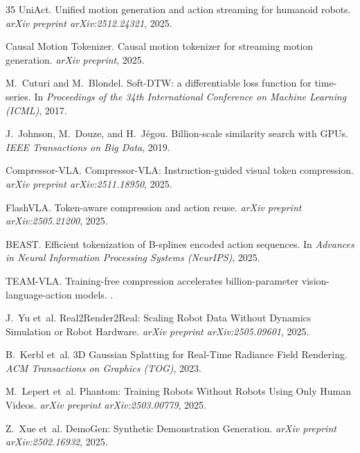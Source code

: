 \documentclass[11pt]{article}
\begin{document}
\begin{thebibliography}{35}
  UniAct.
  \newblock Unified motion generation and action streaming for humanoid robots.
  \newblock \emph{arXiv preprint arXiv:2512.24321}, 2025.

  Causal Motion Tokenizer.
  \newblock Causal motion tokenizer for streaming motion generation.
  \newblock \emph{arXiv preprint}, 2025.

  M.~Cuturi and M.~Blondel.
  \newblock Soft-DTW: a differentiable loss function for time-series.
  \newblock In \emph{Proceedings of the 34th International Conference on Machine Learning (ICML)}, 2017.

  J.~Johnson, M.~Douze, and H.~J\'egou.
  \newblock Billion-scale similarity search with GPUs.
  \newblock \emph{IEEE Transactions on Big Data}, 2019.

  Compressor-VLA.
  \newblock Compressor-VLA: Instruction-guided visual token compression.
  \newblock \emph{arXiv preprint arXiv:2511.18950}, 2025.

  FlashVLA.
  \newblock Token-aware compression and action reuse.
  \newblock \emph{arXiv preprint arXiv:2505.21200}, 2025.

  BEAST.
  \newblock Efficient tokenization of B-splines encoded action sequences.
  \newblock In \emph{Advances in Neural Information Processing Systems (NeurIPS)}, 2025.

  TEAM-VLA.
  \newblock Training-free compression accelerates billion-parameter vision-language-action models.
  .

  J.~Yu et~al.
  \newblock Real2Render2Real: Scaling Robot Data Without Dynamics Simulation or Robot Hardware.
  \newblock \emph{arXiv preprint arXiv:2505.09601}, 2025.

  B.~Kerbl et~al.
  \newblock 3D Gaussian Splatting for Real-Time Radiance Field Rendering.
  \newblock \emph{ACM Transactions on Graphics (TOG)}, 2023.

  M.~Lepert et~al.
  \newblock Phantom: Training Robots Without Robots Using Only Human Videos.
  \newblock \emph{arXiv preprint arXiv:2503.00779}, 2025.

  Z.~Xue et~al.
  \newblock DemoGen: Synthetic Demonstration Generation.
  \newblock \emph{arXiv preprint arXiv:2502.16932}, 2025.


\end{thebibliography}
\end{document}
